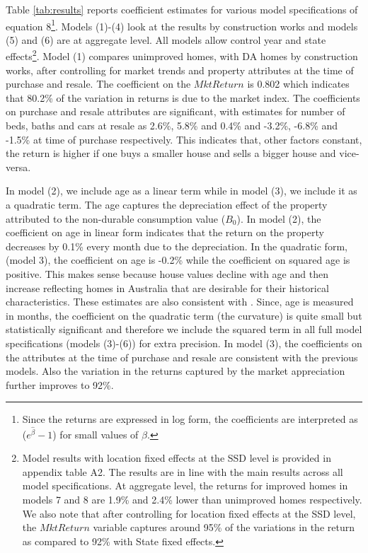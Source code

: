 \documentclass[AEJ,reqno, draftmode]{AEA} %
\begin{document}
Table \ref{tab:results} reports coefficient estimates for various model specifications of equation 8\footnote{Since the returns are expressed in log form, the coefficients are interpreted as ($e^{\hat{\beta}}-1$) for small values of $\beta$.}. Models (1)-(4) look at the results by construction works and models (5) and (6) are at aggregate level. All models allow control year and state effects\footnote{Model results with location fixed effects at the SSD level is provided in appendix table A2. The results are in line with the main results across all model specifications. At aggregate level, the returns for improved homes in models 7 and 8 are 1.9\% and 2.4\% lower than unimproved homes respectively. We also note that after controlling for location fixed effects at the SSD level, the $MktReturn$ variable captures around 95\% of the variations in the return as compared to 92\% with State fixed effects.}. Model (1) compares unimproved homes, with DA homes by construction works, after controlling for market trends and property attributes at the time of purchase and resale. The coefficient on the $MktReturn$ is 0.802 which indicates that 80.2\% of the variation in returns is due to the market index. The coefficients on purchase and resale attributes are significant, with estimates for number of beds, baths and cars at resale as 2.6\%, 5.8\% and 0.4\% and -3.2\%, -6.8\% and -1.5\% at time of purchase respectively. This indicates that, other factors constant, the return is higher if one buys a smaller house and sells a bigger house and vice-versa. 

In model (2), we include age as a linear term while in model (3), we include it as a quadratic term. The age captures the depreciation effect of the property attributed to the non-durable consumption value ($B_0$). In model (2), the coefficient on age in linear form indicates that the return on the property decreases by 0.1\% every month due to the depreciation. In the quadratic form, (model 3), the coefficient on age is -0.2\% while the coefficient on squared age is positive. This makes sense because house values decline with age and then increase reflecting homes in Australia that are desirable for their historical characteristics. These estimates are also consistent with \citep{kiel1995effect}. Since, age is measured in months, the coefficient on the quadratic term (the curvature) is quite small but statistically significant and therefore we include the squared term in all full model specifications (models (3)-(6)) for extra precision. In model (3), the coefficients on the attributes at the time of purchase and resale are consistent with the previous models. Also the variation in the returns captured by the market appreciation further improves to 92\%.
\end{document}
